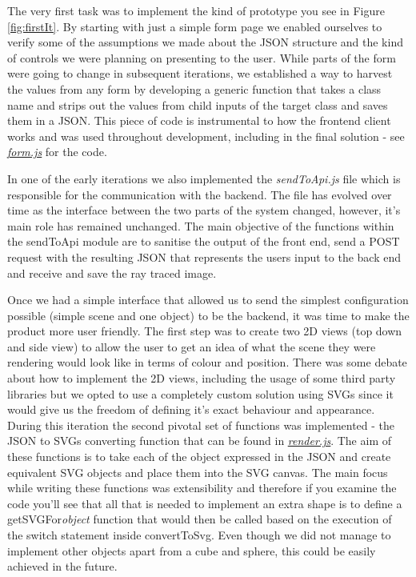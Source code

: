 \documentclass[a4paper]{report}
\begin{document}
	\par The very first task was to implement the kind of prototype you see in Figure \ref{fig:firstIt}. By starting with just a simple form page we enabled ourselves to verify some of the assumptions we made about the JSON structure and the kind of controls we were planning on presenting to the user. While parts of the form were going to change in subsequent iterations, we established a way to harvest the values from any form by developing a generic function that takes a class name and strips out the values from child inputs of the target class and saves them in a JSON. This piece of code is instrumental to how the frontend client works and was used throughout development, including in the final solution - see \href{https://github.com/davidbenicek/raytracer/blob/e85055df16c4534989220de84ce67656a276bf33/src/RayTracer/Public/js/form.js#L30}{\underline{\textit{form.js}}} for the code.\newline 
	
	In one of the early iterations we also implemented the \textit{sendToApi.js} file which is responsible for the communication with the backend. The file has evolved over time as the interface between the two parts of the system changed, however, it's main role has remained unchanged. The main objective of the functions within the sendToApi module are to sanitise the output of the front end, send a POST request with the resulting JSON that represents the users input to the back end and receive and save the ray traced image. 
	
	\par Once we had a simple interface that allowed us to send the simplest configuration possible (simple scene and one object) to be the backend, it was time to make the product more user friendly. The first step was to create two 2D views (top down and side view) to allow the user to get an idea of what the scene they were rendering would look like in terms of colour and position. There was some debate about how to implement the 2D views, including the usage of some third party libraries but we opted to use a completely custom solution using SVGs since it would give us the freedom of defining it's exact behaviour and appearance. During this iteration the second pivotal set of functions was implemented - the JSON to SVGs converting function that can be found in \href{https://github.com/davidbenicek/raytracer/blob/e85055df16c4534989220de84ce67656a276bf33/src/RayTracer/Public/js/render.js#L43}{\underline{\textit{render.js}}}. The aim of these functions is to take each of the object expressed in the JSON and create equivalent SVG objects and place them into the SVG canvas. The main focus while writing these functions was extensibility and therefore if you examine the code you'll see that all that is needed to implement an extra shape is to define a getSVGFor\textit{object} function that would then be called based on the execution of the switch statement inside convertToSvg. Even though we did not manage to implement other objects apart from a cube and sphere, this could be easily achieved in the future. \newline
	
\end{document}
